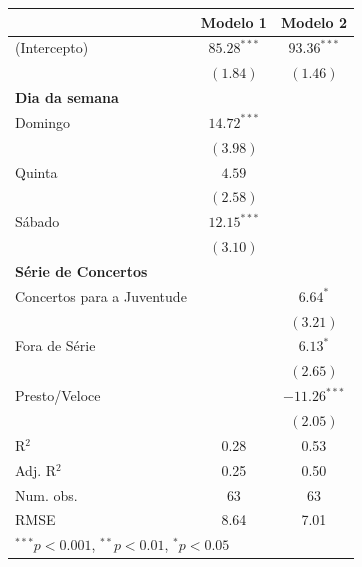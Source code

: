 \documentclass[a4paper, 12pt, openright, oneside, german, french, english, brazil]{abntex2}
\begin{document}
	
	\begin{table}[!ht]
		{\begin{tabular}{l c c }
				\hline
				& Modelo 1 & Modelo 2 \\
				\hline
				(Intercepto)                                        & $85.28^{***}$ & $93.36^{***}$  \\
				& $(1.84)$      & $(1.46)$       \\
				\textbf{Dia da semana} & & \\
				Domingo & $14.72^{***}$ &                \\
				& $(3.98)$      &                \\
				Quinta  & $4.59$        &                \\
				& $(2.58)$      &                \\
				Sábado  & $12.15^{***}$ &                \\
				& $(3.10)$      &                \\
				\textbf{Série de Concertos} & & \\
				Concertos para a Juventude                    &               & $6.64^{*}$     \\
				&               & $(3.21)$       \\
				Fora de Série                                 &               & $6.13^{*}$     \\
				&               & $(2.65)$       \\
				Presto/Veloce                                 &               & $-11.26^{***}$ \\
				&               & $(2.05)$       \\
				\hline
				R$^2$                                              & 0.28          & 0.53           \\
				Adj. R$^2$                                         & 0.25          & 0.50           \\
				Num. obs.                                          & 63            & 63             \\
				RMSE                                               & 8.64          & 7.01           \\
				\hline
				\multicolumn{3}{l}{\scriptsize{$^{***}p<0.001$, $^{**}p<0.01$, $^*p<0.05$}}
			\end{tabular}
		}
		{}
	\end{table}
	
\end{document}
